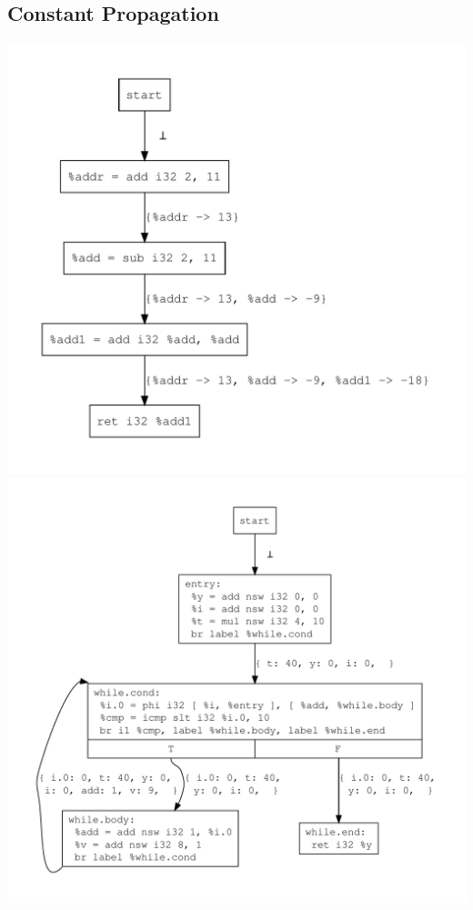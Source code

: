 \documentclass{article}
\theoremstyle{definition}
\begin{document}
\subsection{Constant Propagation}
\includegraphics[scale=.4]{figures/cp/simple_add/simple_add.pdf}
\includegraphics[scale=.4]{figures/cp/cp_loop/cp_loop.pdf}
\end{document}
